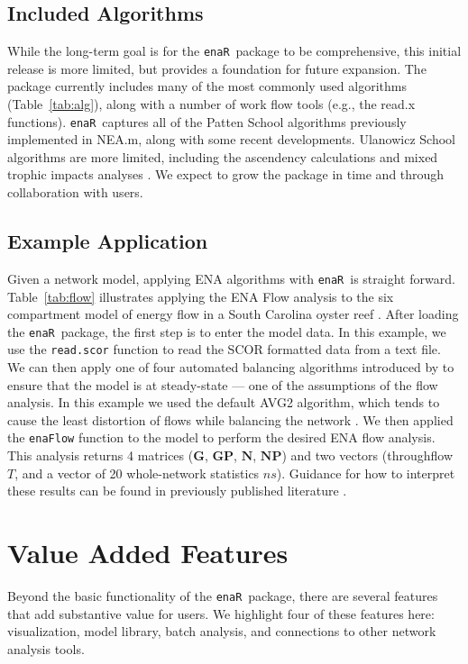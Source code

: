 \documentclass[11pt]{article}
\newcommand{\enaR}{\texttt{enaR}}
\begin{document}
\begin{spacing}{2}
\subsection{Included Algorithms}
While the long-term goal is for the \enaR\ package to be
comprehensive, this initial release is more limited, but provides a
foundation for future expansion. The package currently includes many
of the most commonly used algorithms (Table~\ref{tab:alg}), along with
a number of work flow tools (e.g., the read.x functions).  \enaR\
captures all of the Patten School algorithms previously implemented in
NEA.m, along with some recent developments.  Ulanowicz School
algorithms are more limited, including the ascendency calculations
\citep{ulanowicz97} and mixed trophic impacts analyses
\citep{ulanowicz90}.  We expect to grow the package in time and
through collaboration with users.

\subsection{Example Application}
Given a network model, applying ENA algorithms with \enaR\ is straight
forward.  Table~\ref{tab:flow} illustrates applying the ENA Flow
analysis to the six compartment model of energy flow in a South
Carolina oyster reef \citep{dame81}.  After loading the \enaR\
package, the first step is to enter the model data.  In this example,
we use the \texttt{read.scor} function to read the SCOR formatted data
from a text file.  We can then apply one of four automated balancing
algorithms introduced by \citet[AVG, Input-Output, Ouput-Input,
AVG2,][]{allesina03} to ensure that the model is at steady-state ---
one of the assumptions of the flow analysis.  In this example we used
the default AVG2 algorithm, which tends to cause the least distortion
of flows while balancing the network \citep{allesina03}.  We then
applied the \texttt{enaFlow} function to the model to perform the
desired ENA flow analysis.  This analysis returns 4 matrices
($\mathbf{G}$, $\mathbf{GP}$, $\mathbf{N}$, $\mathbf{NP}$) and two
vectors (throughflow $T$, and a vector of 20 whole-network statistics
$ns$).  Guidance for how to interpret these results can be found in
previously published literature \citep{fath06, schramski11}.

\section{Value Added Features}
Beyond the basic functionality of the \enaR\ package, there are
several features that add substantive value for users.  We highlight
four of these features here: visualization, model library, batch
analysis, and connections to other network analysis tools.


\end{spacing}
\end{document}
